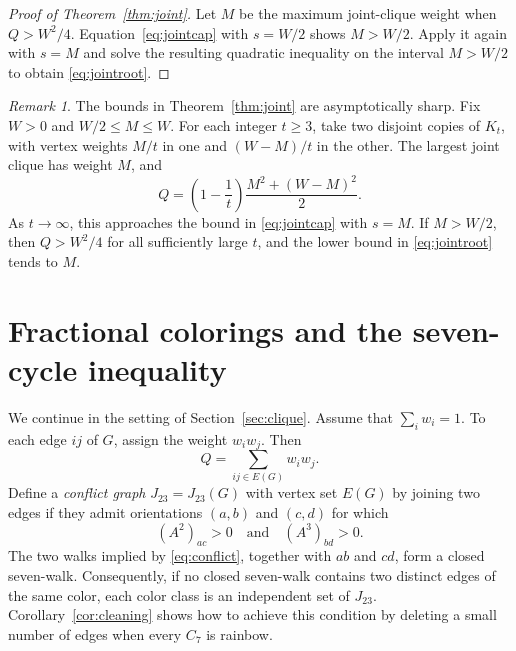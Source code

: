 \documentclass[10pt]{article}
\theoremstyle{remark}
\newtheorem{rmk}[thm]{Remark}
\begin{document}
\begin{proof}[Proof of Theorem~\ref{thm:joint}]
Let $M$ be the maximum joint-clique weight when $Q>W^2/4$. Equation~\eqref{eq:jointcap} with $s=W/2$ shows $M>W/2$. Apply it again with $s=M$ and solve the resulting quadratic inequality on the interval $M>W/2$ to obtain \eqref{eq:jointroot}.
\end{proof}

\begin{rmk}
The bounds in Theorem~\ref{thm:joint} are asymptotically sharp. Fix $W>0$ and $W/2\le M\le W$. For each integer $t\ge3$, take two disjoint copies of $K_t$, with vertex weights $M/t$ in one and $(W-M)/t$ in the other. The largest joint clique has weight $M$, and
\[
 Q=\left(1-\frac1t\right)\frac{M^2+(W-M)^2}{2}.
\]
As $t\to\infty$, this approaches the bound in \eqref{eq:jointcap} with $s=M$. If $M>W/2$, then $Q>W^2/4$ for all sufficiently large $t$, and the lower bound in \eqref{eq:jointroot} tends to $M$.
\end{rmk}

\section{Fractional colorings and the seven-cycle inequality}\label{sec:finite}

We continue in the setting of Section~\ref{sec:clique}. Assume that $\sum_iw_i=1$. To each edge $ij$ of $G$, assign the weight $w_iw_j$. Then
\[
Q=\sum_{ij\in E(G)}w_iw_j.
\]
Define a \emph{conflict graph} $J_{23}=J_{23}(G)$ with vertex set $E(G)$ by joining two edges if they admit orientations $(a,b)$ and $(c,d)$ for which
\begin{equation}\label{eq:conflict}
 (A^2)_{ac}>0\quad\text{and}\quad(A^3)_{bd}>0.
\end{equation}
The two walks implied by \eqref{eq:conflict}, together with $ab$ and $cd$, form a closed seven-walk. Consequently, if no closed seven-walk contains two distinct edges of the same color, each color class is an independent set of $J_{23}$. Corollary~\ref{cor:cleaning} shows how to achieve this condition by deleting a small number of edges when every $C_7$ is rainbow.
\end{document}
